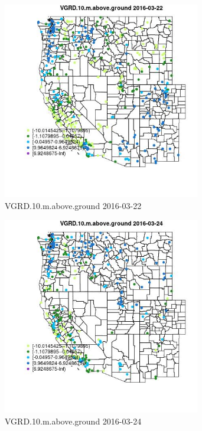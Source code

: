 \begin{figure} 
\centering  
\includegraphics[width=0.77\textwidth]{Code_Outputs/Report_ML_input_PM25_Step4_part_e_de_duplicated_aveswNAs_MapObsVGRD10maboveground2016-03-22.jpg} 
\caption{\label{fig:Report_ML_input_PM25_Step4_part_e_de_duplicated_aveswNAsMapObsVGRD10maboveground2016-03-22}VGRD.10.m.above.ground 2016-03-22} 
\end{figure} 
 

\clearpage 

\begin{figure} 
\centering  
\includegraphics[width=0.77\textwidth]{Code_Outputs/Report_ML_input_PM25_Step4_part_e_de_duplicated_aveswNAs_MapObsVGRD10maboveground2016-03-24.jpg} 
\caption{\label{fig:Report_ML_input_PM25_Step4_part_e_de_duplicated_aveswNAsMapObsVGRD10maboveground2016-03-24}VGRD.10.m.above.ground 2016-03-24} 
\end{figure} 
 

